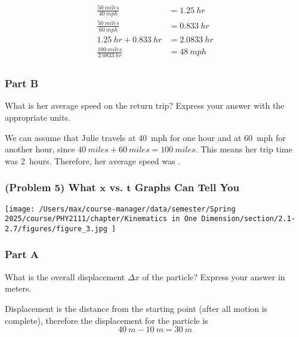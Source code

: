 \begin{solution}
	\begin{align*}
		\frac{\SI{50}{miles}}{\SI{40}{mph}} &= \SI{1.25}{hr} \\
		\frac{\SI{50}{miles}}{\SI{60}{mph}} &= \SI{0.833}{hr} \\
		\SI{1.25}{hr} + \SI{0.833}{hr} &= \SI{2.0833}{hr} \\
		\frac{\SI{100}{miles}}{\SI{2.0833}{hr}} &= \boxed{\SI{48}{mph}} \\
	\end{align*}
\end{solution}

\subsubsection{Part B}
What is her average speed on the return trip?
Express your answer with the appropriate units.

\begin{solution}
	We can assume that Julie travels at \SI{40}{mph} for one hour and at \SI{60}{mph} for another hour, since $\SI{40}{miles} + \SI{60}{miles} = \SI{100}{miles}$. This means her trip time was \SI{2}{hours}. Therefore, her average speed was .
\end{solution}

\newpage

\subsubsection{(Problem 5) What $\mathbf{x}$ vs. $\mathbf{t}$ Graphs Can Tell You}

\begin{center}
	\texttt{[image: /Users/max/course-manager/data/semester/Spring 2025/course/PHY2111/chapter/Kinematics in One Dimension/section/2.1-2.7/figures/figure\_3.jpg
	]}
\end{center}

\subsubsection{Part A}
What is the overall displacement $\Delta x$ of the particle? Express your answer in meters.

\begin{solution}
	Displacement is the distance from the starting point (after all motion is complete), therefore the displacement for the particle is
	\[
		\SI{40}{m}-\SI{10}{m}=\boxed{\SI{30}{m}}
	\]
\end{solution}

